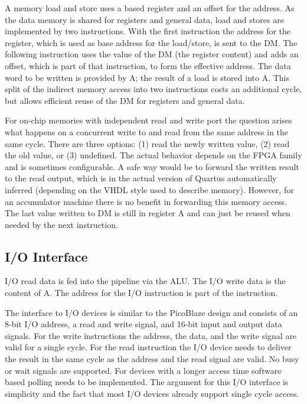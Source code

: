 \documentclass[a4paper,fontsize=10pt,twoside,DIV15,BCOR12mm,headinclude=true,footinclude=false,pagesize,bibtotoc]{scrbook}
\begin{document}
A memory load and store uses a based register and an offset for the address. As the data memory is shared for registers and general data, load and stores are implemented by two instructions. With the first instruction the address for the register, which is used as base address for the load/store, is sent to the DM. The following instruction uses the value of the DM (the register content) and adds an offset, which is part of that instruction, to form the effective address. The data word to be written is provided by A; the result of a load is stored into A. This split of the indirect memory access into two instructions costs an additional cycle, but allows efficient reuse of the DM for registers and general data.

For on-chip memories with independent read and write port the question arises what happens on a concurrent write to and read from the same address in the same cycle. There are three options: (1) read the newly written value, (2) read the old value, or (3) undefined. The actual behavior depends on the FPGA family and is sometimes configurable. A safe way would be to forward the written result to the read output, which is in the actual version of Quartus automatically inferred (depending on the VHDL style used to describe memory). However, for an accumulator machine there is no benefit in forwarding this memory access. The last value written to DM is still in register A and can just be reused when needed by the next instruction.

\subsection{I/O Interface}

I/O read data is fed into the pipeline via the ALU. The I/O write data is the content of A. The address for the I/O instruction is part of the instruction.

The interface to I/O devices is similar to the PicoBlaze design and consists of an 8-bit I/O address, a read and write signal, and 16-bit input and output data signals. For the write instructions the address, the data, and the write signal are valid for a single cycle. For the read instruction the I/O device needs to deliver the result in the same cycle as the address and the read signal are valid. No busy or wait signals are supported. For devices with a longer access time software based polling needs to be implemented. The argument for this I/O interface is simplicity and the fact that most I/O devices already support single cycle access.
\end{document}
